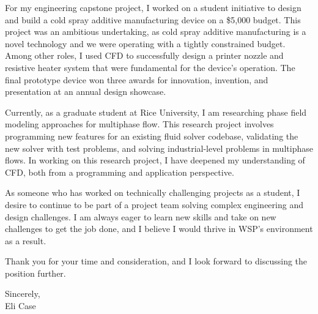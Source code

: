\documentclass[letterpaper,11pt]{letter}
\newcommand{\paragraphbreak}{\vspace{5pt}}
\begin{document}
For my engineering capstone project, I worked on a student initiative to design and build a cold spray additive manufacturing device on a \$5,000 budget. This project was an ambitious undertaking, as cold spray additive manufacturing is a novel technology and we were operating with a tightly constrained budget. Among other roles, I used CFD to successfully design a printer nozzle and resistive heater system that were fundamental for the device's operation. The final prototype device won three awards for innovation, invention, and presentation at an annual design showcase.

\paragraphbreak

Currently, as a graduate student at Rice University, I am researching phase field modeling approaches for multiphase flow. This research project involves programming new features for an existing fluid solver codebase, validating the new solver with test problems, and solving industrial-level problems in multiphase flows. In working on this research project, I have deepened my understanding of CFD, both from a programming and application perspective.

\paragraphbreak

As someone who has worked on technically challenging projects as a student, I desire to continue to be part of a project team solving complex engineering and design challenges. I am always eager to learn new skills and take on new challenges to get the job done, and I believe I would thrive in WSP's environment as a result.

\paragraphbreak

Thank you for your time and consideration, and I look forward to discussing the position further.

\paragraphbreak

Sincerely, \\
Eli Case
\end{document}
